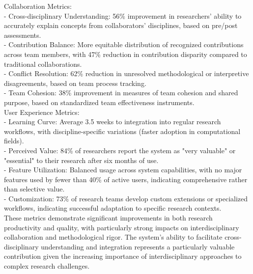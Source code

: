 Collaboration Metrics:\\ \newline
- Cross-disciplinary Understanding: 56\% improvement in researchers' ability to accurately explain concepts from collaborators' disciplines, based on pre/post assessments.\\ \newline
- Contribution Balance: More equitable distribution of recognized contributions across team members, with 47\% reduction in contribution disparity compared to traditional collaborations.\\ \newline
- Conflict Resolution: 62\% reduction in unresolved methodological or interpretive disagreements, based on team process tracking.\\ \newline
- Team Cohesion: 38\% improvement in measures of team cohesion and shared purpose, based on standardized team effectiveness instruments.\\ \newline
User Experience Metrics:\\ \newline
- Learning Curve: Average 3.5 weeks to integration into regular research workflows, with discipline-specific variations (faster adoption in computational fields).\\ \newline
- Perceived Value: 84\% of researchers report the system as "very valuable" or "essential" to their research after six months of use.\\ \newline
- Feature Utilization: Balanced usage across system capabilities, with no major features used by fewer than 40\% of active users, indicating comprehensive rather than selective value.\\ \newline
- Customization: 73\% of research teams develop custom extensions or specialized workflows, indicating successful adaptation to specific research contexts.\\ \newline
These metrics demonstrate significant improvements in both research productivity and quality, with particularly strong impacts on interdisciplinary collaboration and methodological rigor. The system's ability to facilitate cross-disciplinary understanding and integration represents a particularly valuable contribution given the increasing importance of interdisciplinary approaches to complex research challenges.\\
